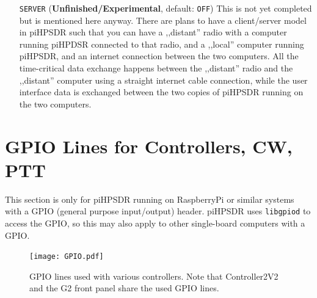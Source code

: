 \documentclass[12pt]{book}
\def\rett#1{\texttt{\color{red}#1}}
\def\pH{pi\-HPSDR\xspace}
\begin{document}
\begin{itemize}
{{\bf Note:} When I  checked the repository mentioned above in November 2024, it seems that the
WDSP version is outdated (version 1.23) so it cannot be used with \pH. Ask the maintainer
of that repository to update their code if you want to use it. Note that since version 1.25, WDSP
contains a new and highly effective ,,trained'' NR2 noise reduction which was very well
received by the community. Having said this, I consider EXTENDED\_NR as deprecated and may
remove it from \pH in the future.
}

\item[\rett{SERVER}] {(\textbf{Unfinished/Experimental}, default: \texttt{OFF})
 This is not yet completed but is mentioned here anyway. There are plans to have
 a client/server model in \pH such that you can have a ,,distant'' radio with a computer
 running piHPDSR connected to that radio, and a ,,local'' computer running \pH, and an
 internet connection between the two computers. All the time-critical data exchange happens
 between the ,,distant'' radio and the ,,distant'' computer using a straight internet
 cable connection, while the user interface data is exchanged between the two copies of
 \pH running on the two computers.
}

\end{itemize}
\chapter[RaspPi GPIO lines]{GPIO Lines for Controllers, CW, PTT}
\label{sec:gpio}
This section is only for \pH running on RaspberryPi or similar systems with a GPIO (general purpose
input/output) header. \pH uses \texttt{libgpiod} to access the GPIO, so this may also apply to
other single-board computers with a GPIO.

\begin{figure}[ht!]
\center
\texttt{[image: GPIO.pdf]}
\caption{GPIO lines used with various controllers. Note that Controller2V2 and the G2 front panel
share the used GPIO lines.}
\label{fig:GPIO}
\end{figure}
\end{document}
